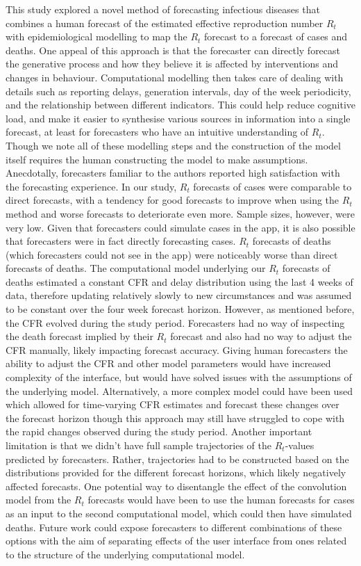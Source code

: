 \documentclass[10pt,a4paper,twocolumn]{article}
\begin{document}
This study explored a novel method of forecasting infectious diseases that combines a human forecast of the estimated effective reproduction number $R_t$ with epidemiological modelling to map the $R_t$ forecast to a forecast of cases and deaths. One appeal of this approach is that the forecaster can directly forecast the generative process and how they believe it is affected by interventions and changes in behaviour. Computational modelling then takes care of dealing with details such as reporting delays, generation intervals, day of the week periodicity, and the relationship between different indicators. This could help reduce cognitive load, and make it easier to synthesise various sources in information into a single forecast, at least for forecasters who have an intuitive understanding of $R_t$. Though we note all of these modelling steps and the construction of the model itself requires the human constructing the model to make assumptions. Anecdotally, forecasters familiar to the authors reported high satisfaction with the forecasting experience. In our study, $R_t$ forecasts of cases were comparable to direct forecasts, with a tendency for good forecasts to improve when using the $R_t$ method and worse forecasts to deteriorate even more. Sample sizes, however, were very low. 
Given that forecasters could simulate cases in the app, it is also possible that forecasters were in fact directly forecasting cases. 
$R_t$ forecasts of deaths (which forecasters could not see in the app) were noticeably worse than direct forecasts of deaths. The computational model underlying our $R_t$ forecasts of deaths estimated a constant CFR and delay distribution using the last 4 weeks of data, therefore updating relatively slowly to new circumstances and was assumed to be constant over the four week forecast horizon. However, as mentioned before, the CFR evolved during the study period. Forecasters had no way of inspecting the death forecast implied by their $R_t$ forecast and also had no way to adjust the CFR manually, likely impacting forecast accuracy. Giving human forecasters the ability to adjust the CFR and other model parameters would have increased complexity of the interface, but would have solved issues with the assumptions of the underlying model. Alternatively, a more complex model could have been used which allowed for time-varying CFR estimates and forecast these changes over the forecast horizon though this approach may still have struggled to cope with the rapid changes observed during the study period. Another important limitation is that we didn't have full sample trajectories of the $R_t$-values predicted by forecasters. Rather, trajectories had to be constructed based on the distributions provided for the different forecast horizons, which likely negatively affected forecasts. One potential way to disentangle the effect of the convolution model from the $R_t$ forecasts would have been to use the human forecasts for cases as an input to the second computational model, which could then have simulated deaths. Future work could expose forecasters to different combinations of these options with the aim of separating effects of the user interface from ones related to the structure of the underlying computational model.
\end{document}
